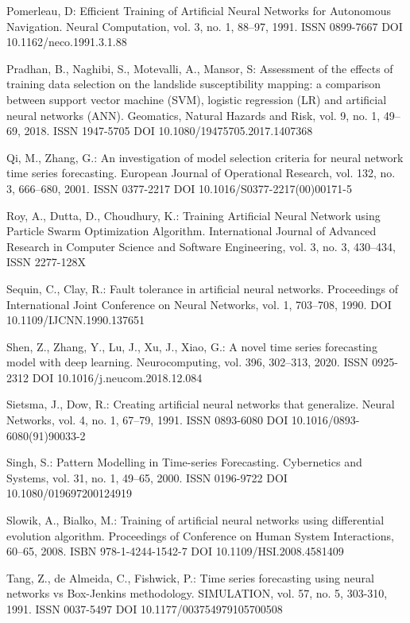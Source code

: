 \begin{thebibliography}{99.}
 Pomerleau, D: Efficient Training of Artificial Neural Networks for Autonomous Navigation. Neural Computation, vol. 3, no. 1, 88--97, 1991. ISSN 0899-7667 DOI 10.1162/neco.1991.3.1.88

 Pradhan, B., Naghibi, S., Motevalli, A., Mansor, S: Assessment of the effects of training data selection on the landslide susceptibility mapping: a comparison between support vector machine (SVM), logistic regression (LR) and artificial neural networks (ANN). Geomatics, Natural Hazards and Risk, vol. 9, no. 1, 49--69, 2018. ISSN 1947-5705 DOI 10.1080/19475705.2017.1407368

 Qi, M., Zhang, G.: An investigation of model selection criteria for neural network time series forecasting. European Journal of Operational Research, vol. 132, no. 3, 666--680, 2001. ISSN 0377-2217 DOI 10.1016/S0377-2217(00)00171-5

 Roy, A., Dutta, D., Choudhury, K.: Training Artificial Neural Network using Particle Swarm Optimization Algorithm. International Journal of Advanced Research in Computer Science and Software Engineering, vol. 3, no. 3, 430--434, ISSN 2277-128X

 Sequin, C., Clay, R.: Fault tolerance in artificial neural networks. Proceedings of International Joint Conference on Neural Networks, vol. 1, 703--708, 1990. DOI 10.1109/IJCNN.1990.137651

 Shen, Z., Zhang, Y., Lu, J., Xu, J., Xiao, G.: A novel time series forecasting model with deep learning. Neurocomputing, vol. 396, 302--313, 2020. ISSN 0925-2312 DOI 10.1016/j.neucom.2018.12.084

 Sietsma, J., Dow, R.: Creating artificial neural networks that generalize. Neural Networks, vol. 4, no. 1, 67--79, 1991. ISSN 0893-6080 DOI 10.1016/0893-6080(91)90033-2

 Singh, S.: Pattern Modelling in Time-series Forecasting. Cybernetics and Systems, vol. 31, no. 1, 49--65, 2000. ISSN 0196-9722 DOI 10.1080/019697200124919

 Slowik, A., Bialko, M.: Training of artificial neural networks using differential evolution algorithm. Proceedings of Conference on Human System Interactions, 60--65, 2008. ISBN 978-1-4244-1542-7 DOI 10.1109/HSI.2008.4581409

 Tang, Z., de Almeida, C., Fishwick, P.: Time series forecasting using neural networks vs Box-Jenkins methodology. SIMULATION, vol. 57, no. 5, 303-310, 1991. ISSN 0037-5497 DOI 10.1177/003754979105700508


\end{thebibliography}

